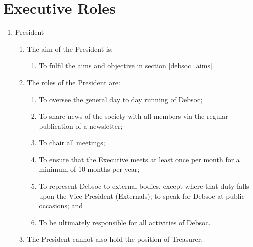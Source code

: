 \newpage
\section{Executive Roles}
\begin{enumerate}
\item President
  \begin{enumerate}
  \item The aim of the President is:
    \begin{enumerate}
    \item To fulfil the aims and objective in section \ref{debsoc_aims}.
    \end{enumerate}
  \item The roles of the President are:
    \begin{enumerate}
    \item To oversee the general day to day running of Debsoc;
    \item To share news of the society with all members via the regular publication of a newsletter;
    \item To chair all meetings;
    \item To ensure that the Executive meets at least once per month for a minimum of 10 months per year;
    \item To represent Debsoc to external bodies, except where that duty falls upon the Vice President (Externals); to speak for Debsoc at public occasions; and
    \item To be ultimately responsible for all activities of Debsoc.
    \end{enumerate}
  \item The President cannot also hold the position of Treasurer.
  \end{enumerate}


\end{enumerate}
